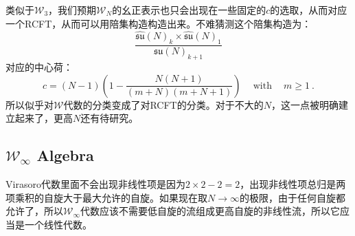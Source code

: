类似于$\mathcal{W}_3$，我们预期$\mathcal{W}_N$的幺正表示也只会出现在一些固定的$c$的选取，从而对应一个RCFT，从而可以用陪集构造构造出来。不难猜测这个陪集构造为：
\begin{equation}
	\frac{\widehat{\mathfrak{su}}(N)_k\times\widehat{\mathfrak{su}}(N)_1}{\mathfrak{su}(N)_{k+1}}
\end{equation}
对应的中心荷：
\begin{equation}
	c=\left(N-1\right)\left(1-\frac{N\left(N+1\right)}{\left(m+N\right)\left(m+N+1\right)}\right)\quad\mathrm{~with~}\quad m\geq1~.
\end{equation}
所以似乎对$\mathcal{W}$代数的分类变成了对RCFT的分类。对于不大的$N$，这一点被明确建立起来了，更高$N$还有待研究。

\subsection{$\mathcal{W}_\infty$ Algebra}
Virasoro代数里面不会出现非线性项是因为$2\times 2-2=2$，出现非线性项总归是两项乘积的自旋大于最大允许的自旋。如果现在取$N\to\infty$的极限，由于任何自旋都允许了，所以$\mathcal{W}_\infty$代数应该不需要低自旋的流组成更高自旋的非线性流，所以它应当是一个线性代数。

